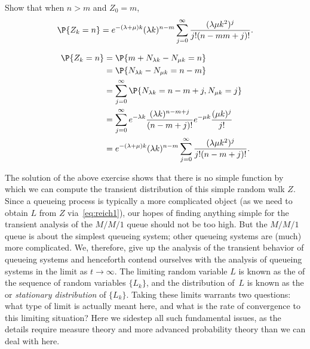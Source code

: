 \begin{exercise}
 Show that when $n>m$ and $Z_0=m$, 
\begin{equation*}
 \P{Z_k=n}
= e^{-(\lambda+\mu)k} (\lambda k)^{n-m} \sum_{j=0}^\infty 
\frac{(\lambda\mu k^2)^j} {j!(n-mm+j)!}.
\end{equation*}
\begin{solution}
\begin{equation}\label{eq:29}
 \begin{split}
 \P{Z_k=n}
&= \P{m+N_{\lambda k } - N_{\mu k} = n } \\ 
&= \P{N_{\lambda k}  - N_{\mu k}  = n - m } \\
&= \sum_{j=0}^\infty \P{N_{\lambda k}  =  n - m + j, N_{\mu k} =j}\\
&= \sum_{j=0}^\infty e^{-\lambda k} \frac{(\lambda k )^{n - m + j}}{(n-m+j)!} e^{-\mu k} \frac{(\mu k )^j}{j!} \\
&= e^{-(\lambda+\mu)k} (\lambda k)^{n-m} \sum_{j=0}^\infty  \frac{(\lambda\mu k^2)^j} {j!(n-m+j)!}.
 \end{split}
\end{equation}
\end{solution}
\end{exercise}


The solution of the above exercise shows that there is no simple function by which we can compute the transient distribution of this simple random walk $Z$.
Since a queueing process is typically a more complicated object (as we need to obtain $L$ from $Z$ via~\cref{eq:reich1}), our hopes of finding anything simple for the transient analysis of the $M/M/1$ queue should not be too high.
But the $M/M/1$ queue is about the simplest queueing system; other queueing systems are (much) more complicated.
We, therefore, give up the analysis of the transient behavior of queueing systems and henceforth contend ourselves with the analysis of queueing systems in the limit as $t\to\infty$.
The limiting random variable $L$ is known as the  of the sequence of random variables $\{L_k\}$, and the distribution of~$L$ is known as the  or \emph{stationary distribution} of $\{L_k\}$.
Taking these limits warrants two questions: what type of limit is actually meant here, and what is the rate of convergence to this limiting situation?
Here we sidestep all such fundamental issues, as the details require measure theory and more advanced probability theory than we can deal with here.


